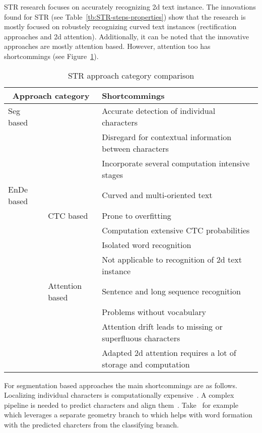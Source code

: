 \ac{STR} research focuses on accurately recognizing 2d text instance.
The innovations found for \ac{STR} (see Table~\ref{tb:STR-steps-properties}) show that the research
is mostly focused on robustely recognizing curved text instances (rectification approaches and
2d attention).
Additionally, it can be noted that the innovative approaches are mostly attention based.
However, attention too has shortcommings (see Figure~\ref{tb:STR-comparison}).
\begin{table}[h]
    \centering\scriptsize
    \begin{tabular}{p{}p{}p{}}
        \multicolumn{2}{c}{\textbf{Approach category}} & \textbf{Shortcommings} \\
        \toprule
        Seg based & & Accurate detection of individual
                        characters~\citep{chen_text_2021,cheng_aon_2018} \\
        & & Disregard for contextual information between characters~\citep{chen_text_2021} \\
        & & Incorporate several computation intensive stages~\citep{liu_abcnet_2020} \\
        \midrule
        \ac{EnDe} based & & Curved and multi-oriented text~\citep{cheng_aon_2018, long_scene_2021} \\
        & CTC based & Prone to overfitting~\citep{chen_text_2021} \\
        & & Computation extensive CTC probabilities~\citep{xie_aggregation_2019} \\
        & & Isolated word recognition~\citep{cong_comparative_2019} \\
        & & Not applicable to recognition of 2d text instance~\citep{cheng_focusing_2017,
            xie_aggregation_2019,chen_text_2021} \\
        & Attention based & Sentence and long sequence
            recognition~\citep{cong_comparative_2019,chen_text_2021} \\
        & & Problems without vocabulary~\citep{wan_vocabulary_2020} \\
        & & Attention drift leads to missing or superfluous
            characters~\citep{liao_scene_2018,xie_aggregation_2019,chen_text_2021}\\
        & & Adapted 2d attention requires a lot of storage and
            computation~\citep{xie_aggregation_2019,chen_text_2021} \\
        \bottomrule
    \end{tabular}
    \caption{STR approach category comparison\label{tb:STR-comparison}}
\end{table}
For segmentation based approaches the main shortcommings are as follows.
Localizing individual characters is computationally expensive~\citep{zhan_esir_2019}.
A complex pipeline is needed to predict characters and align them~\citep{liu_abcnet_2020}.
Take~\cite{wan_textscanner_2020} for example which leverages a separate geometry branch
to which helps with word formation with the predicted charcters from the classifying branch.

